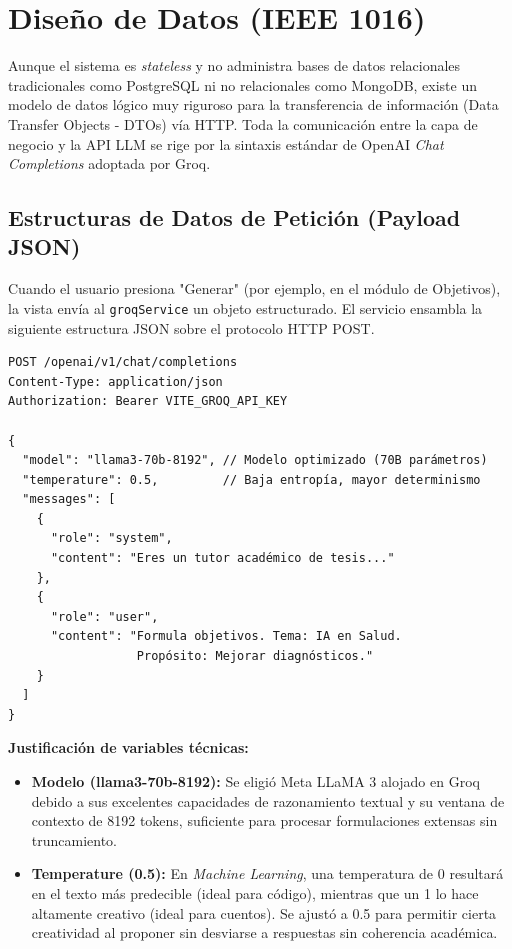 \section{Diseño de Datos (IEEE 1016)}

Aunque el sistema es \textit{stateless} y no administra bases de datos relacionales tradicionales como PostgreSQL ni no relacionales como MongoDB, existe un modelo de datos lógico muy riguroso para la transferencia de información (Data Transfer Objects - DTOs) vía HTTP. Toda la comunicación entre la capa de negocio y la API LLM se rige por la sintaxis estándar de OpenAI \textit{Chat Completions} adoptada por Groq.

\subsection{Estructuras de Datos de Petición (Payload JSON)}
Cuando el usuario presiona "Generar" (por ejemplo, en el módulo de Objetivos), la vista envía al \texttt{groqService} un objeto estructurado. El servicio ensambla la siguiente estructura JSON sobre el protocolo HTTP POST.

\begin{verbatim}
POST /openai/v1/chat/completions
Content-Type: application/json
Authorization: Bearer VITE_GROQ_API_KEY

{
  "model": "llama3-70b-8192", // Modelo optimizado (70B parámetros)
  "temperature": 0.5,         // Baja entropía, mayor determinismo
  "messages": [
    {
      "role": "system",
      "content": "Eres un tutor académico de tesis..."
    },
    {
      "role": "user",
      "content": "Formula objetivos. Tema: IA en Salud. 
                  Propósito: Mejorar diagnósticos."
    }
  ]
}
\end{verbatim}

\textbf{Justificación de variables técnicas:}
\begin{itemize}
    \item \textbf{Modelo (llama3-70b-8192):} Se eligió Meta LLaMA 3 alojado en Groq debido a sus excelentes capacidades de razonamiento textual y su ventana de contexto de 8192 tokens, suficiente para procesar formulaciones extensas sin truncamiento.
    \item \textbf{Temperature (0.5):} En \textit{Machine Learning}, una temperatura de 0 resultará en el texto más predecible (ideal para código), mientras que un 1 lo hace altamente creativo (ideal para cuentos). Se ajustó a 0.5 para permitir cierta creatividad al proponer sin desviarse a respuestas sin coherencia académica.
\end{itemize}


